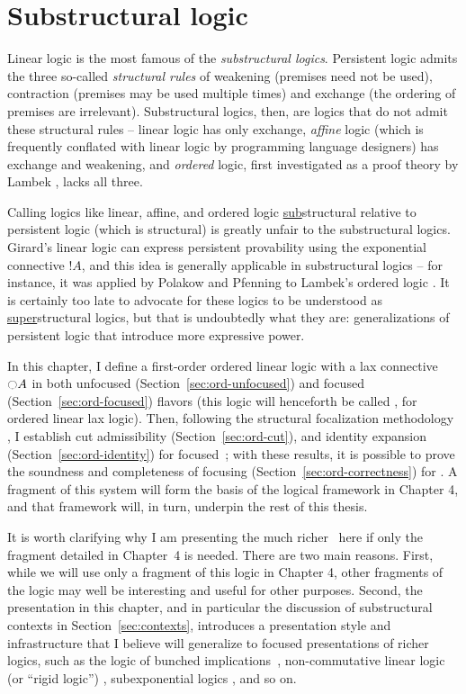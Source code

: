 \chapter{Substructural logic}
\label{chapter-order}

Linear logic is the most famous of the {\it substructural logics}.
Persistent logic admits the three so-called {\it structural rules} of
weakening (premises need not be used), contraction (premises may be
used multiple times) and exchange (the ordering of premises are
irrelevant). Substructural logics, then, are logics that do not admit
these structural rules -- linear logic has only exchange, {\it affine}
logic (which is frequently conflated with linear logic by programming
language designers) has exchange and weakening, and {\it ordered}
logic, first investigated as a proof theory by Lambek
\cite{lambek58mathematics}, lacks all three.  

Calling logics like
linear, affine, and ordered logic \underline{sub}structural relative
to persistent logic (which is structural) is greatly unfair to the
substructural logics. Girard's linear logic can express persistent
provability using the exponential connective ${!}A$, and this idea is
generally applicable in substructural logics -- for instance, it was
applied by Polakow and Pfenning to Lambek's ordered logic
\cite{polakow99natural}. It is certainly too
late to advocate for these logics to be understood as
\underline{super}structural logics, but that is undoubtedly what they
are: generalizations of persistent logic that introduce more 
expressive power. 

In this chapter, I define a first-order ordered linear logic with a
lax connective ${\ocircle}A$ in both unfocused
(Section~\ref{sec:ord-unfocused}) and focused
(Section~\ref{sec:ord-focused}) flavors (this logic will henceforth be
called \ollll, for ordered linear lax logic). Then, following the
structural focalization methodology \cite{simmons11structural}, I
establish cut admissibility (Section~\ref{sec:ord-cut}), and identity
expansion (Section~\ref{sec:ord-identity}) for focused~\ollll; with
these results, it is possible to prove the soundness and completeness
of focusing (Section~\ref{sec:ord-correctness}) for \ollll.  A
fragment of this system will form the basis of the logical framework
in Chapter 4, and that framework will, in turn, underpin the rest of
this thesis.

It is worth clarifying why I am presenting the much richer \ollll~here
if only the fragment detailed in Chapter~4 is needed. There are two
main reasons.  First, while we will use only a fragment of this logic
in Chapter 4, other fragments of the logic may well be interesting and
useful for other purposes. Second, the presentation in this chapter,
and in particular the discussion of substructural contexts in
Section~\ref{sec:contexts}, introduces a presentation style and
infrastructure that I believe will generalize to focused presentations
of richer logics, such as the logic of bunched
implications~\cite{pym02semantics}, non-commutative linear logic (or
``rigid logic'') \cite{simmons09linear}, subexponential logics
\cite{nigam09algorithmic}, and so on.

